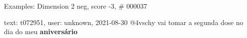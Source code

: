 \begin{frame}{Examples: Dimension 2 neg, score -3, \# 000037}
\footnotesize
\begin{alertblock}{text: t072951, user: unknown, 2021-08-30}
@4vschy vai tomar a segunda dose no dia do meu \textbf{aniversário} 
\end{alertblock}
\end{frame}
